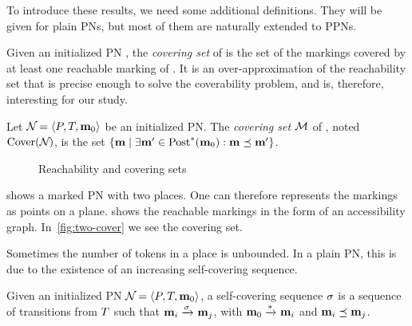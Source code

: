 To introduce these results, we need some additional definitions.
They will be given for plain \acp{PN}, but most of them are naturally extended to \acp{PPN}.

Given an initialized \ac{PN} \namePN, the \emph{covering set} of \namePN is the set of the markings covered by at least one reachable marking of \namePN.
It is an over-approximation of the reachability set that is precise enough to solve the coverability problem, and is, therefore, interesting for our study.

\begin{defi}
  Let $\defPN$ be an initialized \ac{PN}.
  The \emph{covering set} $\mathcal{M}$ of \namePN, noted $\operatorname{Cover}(\mathcal{N}_{})$, is the set $\left\{\mathbf{m} \mid \exists \mathbf{m}' \in \operatorname{Post}^*_{{}}(\mathbf{m}_0) : \mathbf{m} \preceq \mathbf{m}' \right\}$.
\end{defi}

\begin{figure}[htbp]
  \label{fig:reach-and-cover-example}
  \centering
  \subfloat[A \ac{PN} ($\card{\places} = 2$)]{
    \label{fig:two-net}
    

  }

  \qquad
  \caption{Reachability and covering sets}
\end{figure}

 shows a marked \ac{PN} with two places.
One can therefore represents the markings as points on a plane.
 shows the reachable markings in the form of an accessibility graph.
In~\ref{fig:two-cover} we see the covering set.

Sometimes the number of tokens in a place is unbounded. %
In a plain \ac{PN}, this is due to the existence of an increasing self-covering sequence.
\begin{defi}
  Given an initialized \ac{PN} $\defPN$,
  a self-covering sequence $\seqt$ is a sequence of transitions from $T$ such that
  \(
    \mar_i \fire{\seqt} \mar_j
  \),
  with $\mathbf{m}_0 \xrightarrow{*}_{} \mathbf{m}_i$ %
  and $\mathbf{m}_i \preceq \mathbf{m}_j$.
\end{defi}

